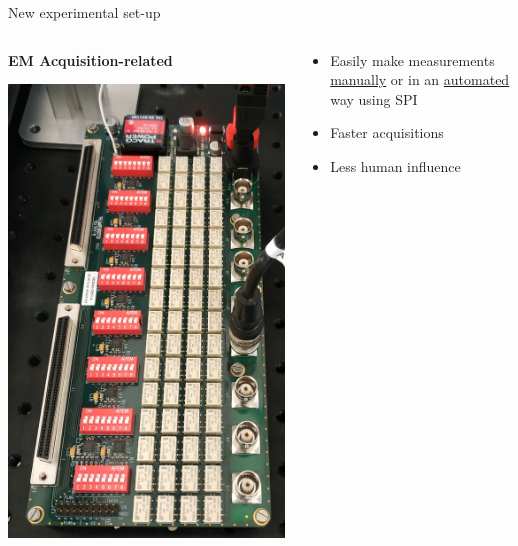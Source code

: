 \documentclass[utf8]{beamer} \usetheme{lfcr} %
\begin{document}
\begin{frame}{New experimental set-up}
  \begin{columns}
    \begin{column}{0.5\textwidth}
      \textbf{EM Acquisition-related}

      \includegraphics[width=\textwidth]{IMG_20200224_150608.jpg}
    \end{column}
    \begin{column}{0.5\textwidth}
      \begin{itemize}
        \item Easily make measurements \uline{manually} or in an \uline{automated} way using SPI
        \item Faster acquisitions
        \item Less human influence
      \end{itemize}

    \end{column}
  \end{columns}
\end{frame}
%
\end{document}
